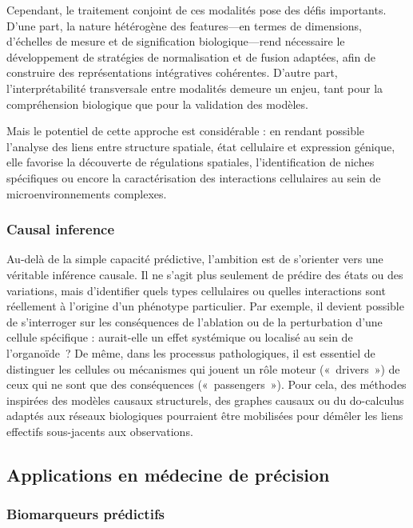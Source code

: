 Cependant, le traitement conjoint de ces modalités pose des défis importants. D’une part, la nature hétérogène des features—en termes de dimensions, d’échelles de mesure et de signification biologique—rend nécessaire le développement de stratégies de normalisation et de fusion adaptées, afin de construire des représentations intégratives cohérentes. D’autre part, l’interprétabilité transversale entre modalités demeure un enjeu, tant pour la compréhension biologique que pour la validation des modèles.

Mais le potentiel de cette approche est considérable : en rendant possible l’analyse des liens entre structure spatiale, état cellulaire et expression génique, elle favorise la découverte de régulations spatiales, l’identification de niches spécifiques ou encore la caractérisation des interactions cellulaires au sein de microenvironnements complexes.

\subsubsection{Causal inference}

Au-delà de la simple capacité prédictive, l’ambition est de s’orienter vers une véritable inférence causale. Il ne s’agit plus seulement de prédire des états ou des variations, mais d’identifier quels types cellulaires ou quelles interactions sont réellement à l’origine d’un phénotype particulier. Par exemple, il devient possible de s’interroger sur les conséquences de l’ablation ou de la perturbation d’une cellule spécifique : aurait-elle un effet systémique ou localisé au sein de l’organoïde ? De même, dans les processus pathologiques, il est essentiel de distinguer les cellules ou mécanismes qui jouent un rôle moteur (« drivers ») de ceux qui ne sont que des conséquences (« passengers »). Pour cela, des méthodes inspirées des modèles causaux structurels, des graphes causaux ou du do-calculus adaptés aux réseaux biologiques pourraient être mobilisées pour démêler les liens effectifs sous-jacents aux observations.

\subsection{Applications en médecine de précision}

\subsubsection{Biomarqueurs prédictifs}

